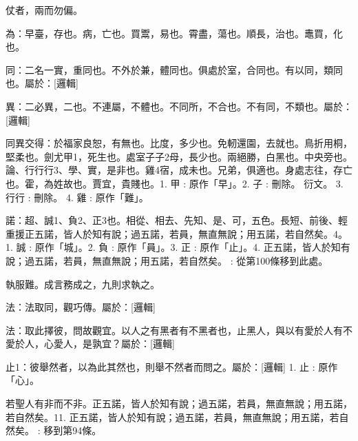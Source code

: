 \begin{pinyinscope}
仗者，兩而勿偏。

為：早臺，存也。病，亡也。買鬻，易也。霄盡，蕩也。順長，治也。鼃買，化也。

同：二名一實，重同也。不外於兼，體同也。俱處於室，合同也。有以同，類同也。屬於：[邏輯]

異：二必異，二也。不連屬，不體也。不同所，不合也。不有同，不類也。屬於：[邏輯]

同異交得：於福家良恕，有無也。比度，多少也。免軔還園，去就也。鳥折用桐，堅柔也。劍尤甲1，死生也。處室子子2母，長少也。兩絕勝，白黑也。中央旁也。論、行行行3、學、實，是非也。雞4宿，成未也。兄弟，俱適也。身處志往，存亡也。霍，為姓故也。賈宜，貴賤也。1. 甲 : 原作「早」。2. 子 : 刪除。 衍文。 3. 行行 : 刪除。  4. 雞 : 原作「難」。









諾：超、誠1、負2、正3也。相從、相去、先知、是、可，五色。長短、前後、輕重援正五諾，皆人於知有說；過五諾，若員，無直無說；用五諾，若自然矣。4。1. 誠 : 原作「城」。2. 負 : 原作「員」。3. 正 : 原作「止」。4. 正五諾，皆人於知有說；過五諾，若員，無直無說；用五諾，若自然矣。 : 從第100條移到此處。

執服難。成言務成之，九則求執之。



法：法取同，觀巧傳。屬於：[邏輯]

法：取此擇彼，問故觀宜。以人之有黑者有不黑者也，止黑人，與以有愛於人有不愛於人，心愛人，是孰宜？屬於：[邏輯]

止1：彼舉然者，以為此其然也，則舉不然者而問之。屬於：[邏輯] 
1. 止 : 原作「心」。

若聖人有非而不非。正五諾，皆人於知有說；過五諾，若員，無直無說；用五諾，若自然矣。11. 正五諾，皆人於知有說；過五諾，若員，無直無說；用五諾，若自然矣。 : 移到第94條。


\end{pinyinscope}